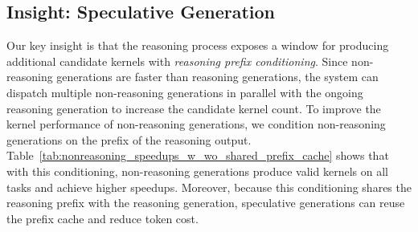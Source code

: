 
\subsection{Insight: Speculative Generation}\label{subsec:design_insight}
Our key insight is that the reasoning process exposes a window for producing
additional candidate kernels with \emph{reasoning prefix conditioning}.
Since non-reasoning generations are faster than reasoning generations, the system can dispatch
multiple non-reasoning generations in parallel with the ongoing reasoning generation to 
increase the candidate kernel count.
To improve the kernel performance of non-reasoning generations, we condition non-reasoning generations
on the prefix of the reasoning output. Table~\ref{tab:nonreasoning_speedups_w_wo_shared_prefix_cache} shows 
that with this conditioning, non-reasoning generations produce valid kernels on all
tasks and achieve higher speedups. Moreover, because this conditioning shares the reasoning prefix with the reasoning
generation, speculative generations can reuse the prefix cache and reduce token
cost.

